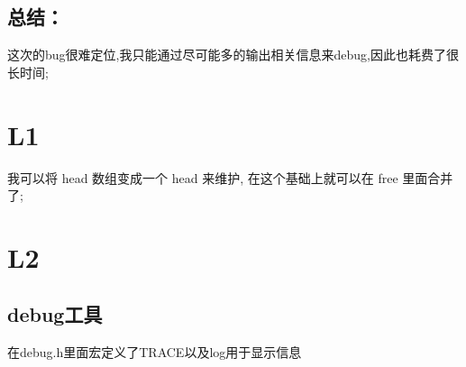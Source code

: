\documentclass[11pt, a4paper, UTF8]{ctexart}
\begin{document}
\subsection{总结：}这次的bug很难定位,我只能通过尽可能多的输出相关信息来debug,因此也耗费了很长时间;
\beginfb
\section{L1}
我可以将 head 数组变成一个 head 来维护, 在这个基础上就可以在 free 里面合并了;
\section{L2}
\subsection{debug工具}在debug.h里面宏定义了TRACE以及log用于显示信息
\end{document}

